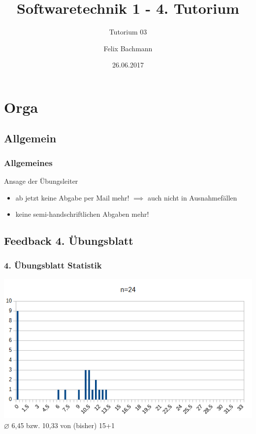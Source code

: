 \documentclass[18pt]{beamer}
\title[SWT1]{Softwaretechnik 1 - 4. Tutorium}
\subtitle{Tutorium 03}
\author{Felix Bachmann}
\date{26.06.2017}
\institute{KIT - Institut für Programmstrukturen und Datenorganisation (IPD)}
\begin{document}

\begin{frame}
\titlepage
\end{frame}

\begin{frame}
\tableofcontents
\end{frame}


\section{Orga}


	\subsection{Allgemein}
	\begin{frame}
		\frametitle{Allgemeines}
		\begin{alertblock}{Ansage der Übungsleiter}
			\begin{itemize}
				\item ab jetzt keine Abgabe per Mail mehr!
				\linebreak $\implies$ auch nicht in Ausnahmefällen \pause
				\item keine semi-handschriftlichen Abgaben mehr!
			\end{itemize}
		\end{alertblock}
	\end{frame}

	\subsection{Feedback 4. Übungsblatt}
	\begin{frame}
		\frametitle{4. Übungsblatt Statistik}
		\includegraphics[scale=0.7]{./pics/tut4/statistics-ub4.png}
		\linebreak \centering $\diameter$ 6,45 bzw. 10,33 von (bisher) 15+1
	\end{frame}
	
\end{document}
